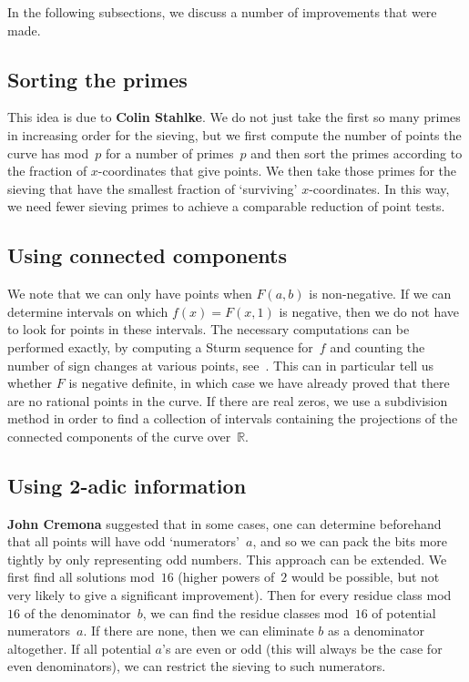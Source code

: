 \documentclass[12pt,a4paper,oneside]{amsart}
\newcommand{\R}{{\mathbb R}}
\begin{document}
In the following subsections, we discuss a number of improvements that
were made.

\subsection{Sorting the primes}

This idea is due to \textbf{Colin Stahlke}. We do not just take the first so many
primes in increasing order for the sieving, but we first compute the
number of points the curve has mod~$p$ for a number of primes~$p$ and then
sort the primes according to the fraction of $x$-coordinates that give points.
We then take those primes for the sieving that have the smallest fraction
of `surviving' $x$-coordinates. In this way, we need fewer sieving primes
to achieve a comparable reduction of point tests.

\subsection{Using connected components}

We note that we can only have points when $F(a, b)$ is non-negative.
If we can determine intervals on which $f(x) = F(x, 1)$ is negative, then
we do not have to look for points in these intervals. The necessary
computations can be performed exactly, by computing a Sturm sequence
for~$f$ and counting the number of sign changes at various points,
see~\cite[Thm.~4.1.10]{Cohen}. This can in particular tell us whether
$F$ is negative definite, in which case we have already proved that there
are no rational points in the curve. If there are real zeros, we use
a subdivision method in order to find a collection of intervals containing
the projections of the connected components of the curve over~$\R$.

\subsection{Using 2-adic information}

\textbf{John Cremona} suggested that in some cases, one can determine beforehand
that all points will have odd `numerators'~$a$, and so we can pack the
bits more tightly by only representing odd numbers. This approach can be
extended. We first find all solutions mod~$16$ (higher powers of~$2$ would
be possible, but not very likely to give a significant improvement). Then for every
residue class mod~$16$ of the denominator~$b$, we can find the residue
classes mod~$16$ of potential numerators~$a$. If there are none, then we
can eliminate $b$ as a denominator altogether. If all potential $a$'s are
even or odd (this will always be the case for even denominators), we can
restrict the sieving to such numerators.
\end{document}
